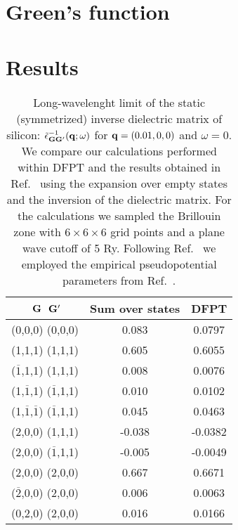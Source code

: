 \documentclass[twocolumn,prb,showpacs,superscriptaddress]{revtex4}
\def\w{\omega}
\def\q{{\bf q}}
\def\G{{\bf G}}
\def\Gp{{\bf G^\prime}}
\def\mo{$\overline{1}$}
\def\mt{$\overline{2}$}
\begin{document}
\section{Green's function}

\section{Results}

\begin{table}[b!]
\caption{\label{tab.1} Long-wavelenght limit of the static (symmetrized)
inverse dielectric matrix of silicon: $\tilde\epsilon^{-1}_{\G\Gp}(\q;\w)$ for
$\q=(0.01,0,0)$ and $\w=0$. We compare our calculations performed within
DFPT and the results obtained in Ref.\ 
using the expansion over empty states and the inversion of the dielectric matrix.
For the calculations we sampled the Brillouin zone with $6\times6\times6$ grid
points and a plane wave cutoff of 5 Ry. Following Ref.\ 
we employed the empirical pseudopotential parameters from Ref.\ .
\vspace{0.5cm}}
\begin{tabular}{c c c}
\hline
\hline
$\,\,\G$\phantom{ciao} $\,\Gp$   & Sum over states\cite{balde_tosa}  &  DFPT  \\
\hline
    (0,0,0) (0,0,0)   & \phantom{-}0.083    &  \phantom{-}0.0797  \\
 (1,1,1)  (1,1,1)     &   \phantom{-}0.605  & \phantom{-}0.6055 \\
(\mo,1,1) (1,1,1)     &   \phantom{-}0.008  & \phantom{-}0.0076 \\
 (1,\mo,1) (\mo,1,1)  & \phantom{-}0.010    & \phantom{-}0.0102 \\
 (1,\mo,\mo) (\mo,1,1)& \phantom{-}0.045    & \phantom{-}0.0463 \\
 (2,0,0) (1,1,1)      &    -0.038           & -0.0382 \\
 (2,0,0) (\mo,1,1)    &    -0.005           & -0.0049 \\
 (2,0,0) (2,0,0)      &  \phantom{-}0.667   & \phantom{-}0.6671 \\
 (\mt,0,0) (2,0,0)    & \phantom{-}0.006    & \phantom{-}0.0063 \\
 (0,2,0) (2,0,0)      &  \phantom{-}0.016   & \phantom{-}0.0166 \\
\hline
\hline
\end{tabular}
\end{table}
\end{document}
